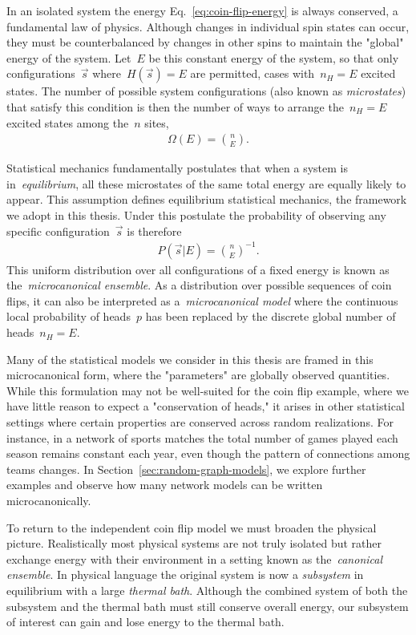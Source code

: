 In an isolated system the energy Eq.~\eqref{eq:coin-flip-energy} is always conserved, a fundamental law of physics. Although changes in individual spin states can occur, they must be counterbalanced by changes in other spins to maintain the "global" energy of the system. Let~$E$ be this constant energy of the system, so that only configurations~$\vec{s}$ where~$H(\vec{s}) = E$ are permitted, cases with~$n_H = E$ excited states. The number of possible system configurations (also known as \emph{microstates}) that satisfy this condition is then the number of ways to arrange the~$n_H = E$ excited states among the~$n$ sites, \begin{align}
    \Omega(E) = \binom{n}{E}. \label{eq:Omega-E}
\end{align}

Statistical mechanics fundamentally postulates that when a system is in~\emph{equilibrium}, all these microstates of the same total energy are equally likely to appear. This assumption defines equilibrium statistical mechanics, the framework we adopt in this thesis. Under this postulate the probability of observing any specific configuration~$\vec{s}$ is therefore \begin{align}
    P(\vec{s}|E) = \binom{n}{E}^{-1}. \label{eq:coin-flip-P-microcanonical}
\end{align}
This uniform distribution over all configurations of a fixed energy is known as the~\emph{microcanonical ensemble}. As a distribution over possible sequences of coin flips, it can also be interpreted as a~\emph{microcanonical model} where the continuous local probability of heads~$p$ has been replaced by the discrete global number of heads~$n_H = E$. 

Many of the statistical models we consider in this thesis are framed in this microcanonical form, where the "parameters" are globally observed quantities. While this formulation may not be well-suited for the coin flip example, where we have little reason to expect a "conservation of heads," it arises in other statistical settings where certain properties are conserved across random realizations. For instance, in a network of sports matches the total number of games played each season remains constant each year, even though the pattern of connections among teams changes. In Section~\ref{sec:random-graph-models}, we explore further examples and observe how many network models can be written microcanonically.

To return to the independent coin flip model we must broaden the physical picture. Realistically most physical systems are not truly isolated but rather exchange energy with their environment in a setting known as the~\emph{canonical ensemble}. In physical language the original system is now a \emph{subsystem} in equilibrium with a large \emph{thermal bath}. Although the combined system of both the subsystem and the thermal bath must still conserve overall energy, our subsystem of interest can gain and lose energy to the thermal bath. 

